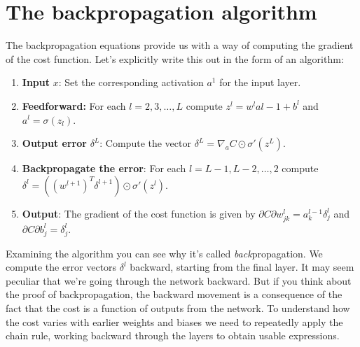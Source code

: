 \documentclass[a4paper,twoside,10pt]{book}
\begin{document}
\section{The backpropagation algorithm}
\label{sec:2.6}
The backpropagation equations provide us with a way of computing the gradient of the cost function. Let's explicitly write this out in the form of an algorithm:
\begin{enumerate}
\item \textbf{Input} $x$: Set the corresponding activation $a^1$ for the input layer.
\item \textbf{Feedforward:} For each $l=2,3,\ldots{},L$ compute $z^l=w^la{l-1}+b^l$ and $a^l=\sigma(z_l)$.
\item \textbf{Output error} $\delta^L$: Compute the vector $\delta^{L} = \nabla_a C \odot \sigma'(z^L)$.
\item \textbf{Backpropagate the error}: For each $l = L-1, L-2,\ldots, 2$ compute $\delta^{l} = ((w^{l+1})^T \delta^{l+1}) \odot \sigma'(z^{l})$.
\item \textbf{Output}: The gradient of the cost function is given by $\partial{}C\partial{}w^l_{jk}=a^{l-1}_k\delta^l_j$ and $\partial{}C\partial{}b^l_j=\delta^l_j$.
\end{enumerate}
Examining the algorithm you can see why it's called\textit{ back}propagation. We compute the error vectors $\delta^l$ backward, starting from the final layer. It may seem peculiar that we're going through the network backward. But if you think about the proof of backpropagation, the backward movement is a consequence of the fact that the cost is a function of outputs from the network. To understand how the cost varies with earlier weights and biases we need to repeatedly apply the chain rule, working backward through the layers to obtain usable expressions.
\end{document}
